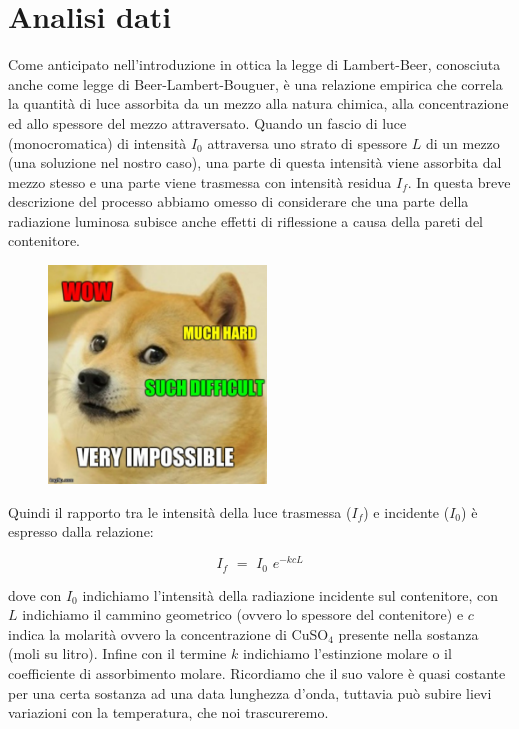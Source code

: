 \section{Analisi dati}

Come anticipato nell'introduzione in ottica la legge di Lambert-Beer, conosciuta anche come legge di Beer-Lambert-Bouguer, è una relazione empirica che correla la quantità di luce assorbita da un mezzo alla natura chimica, alla concentrazione ed allo spessore del mezzo attraversato.
Quando un fascio di luce (monocromatica) di intensità $I_0$ attraversa uno strato di spessore $L$ di un mezzo (una soluzione nel nostro caso), una parte di questa intensità viene assorbita dal mezzo stesso e una parte viene trasmessa con intensità residua $I_f$.
In questa breve descrizione del processo abbiamo omesso di considerare che una parte della radiazione luminosa subisce anche effetti di riflessione a causa della pareti del contenitore.

\begin{figure}
    \vspace{-8mm}
    \begin{center}
        \includegraphics[width=58mm]{doge.pdf}
    \end{center}
    \vspace{-4mm}
\end{figure}

Quindi il rapporto tra le intensità della luce trasmessa ($I_f$) e incidente ($I_0$) è espresso dalla relazione:

\begin{equation}
	I_f \,\,=\,\, I_0 \,\, e^{-kcL}
	\label{eq:intensita}
\end{equation}

dove con $I_0$ indichiamo l'intensità della radiazione incidente sul contenitore, con $L$ indichiamo il cammino geometrico (ovvero lo spessore del contenitore) e $c$ indica la molarità ovvero la concentrazione di CuSO$_4$ presente nella sostanza (moli su litro). Infine con il termine $k$ indichiamo l'estinzione molare o il coefficiente di assorbimento molare. Ricordiamo che il suo valore è quasi costante per una certa sostanza ad una data lunghezza d'onda, tuttavia può subire lievi variazioni con la temperatura, che noi trascureremo.

